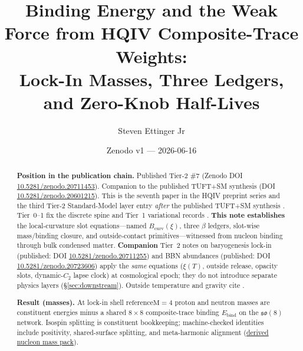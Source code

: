 \documentclass[11pt,notitlepage]{amsart}
\title[Binding energy and the weak force]{Binding Energy and the Weak Force from HQIV Composite-Trace Weights:\\
Lock-In Masses, Three Ledgers, and Zero-Knob Half-Lives}
\author{Steven Ettinger Jr}
\date{Zenodo v1 --- 2026-06-16}
\begin{document}
\begin{abstract}
\noindent\textbf{Position in the publication chain.}
Published Tier-2 \#7 (Zenodo
DOI \href{https://doi.org/10.5281/zenodo.20711453}{10.5281/zenodo.20711453}).
Companion to the published TUFT+SM synthesis \cite{hqiv-tuft-sm-lagrangian-paper}
(DOI \href{https://doi.org/10.5281/zenodo.20601215}{10.5281/zenodo.20601215}).
This is the seventh paper in the HQIV preprint series and the third Tier-2
Standard-Model layer entry \emph{after} the published TUFT+SM synthesis
\cite{hqiv-tuft-sm-lagrangian-paper}. Tier~0--1 fix the discrete spine
\cite{ettinger2026hqiv,hqiv-lightcone-paper,hqiv-so8-paper} and Tier~1 variational
records \cite{hqiv-3d-growth-paper,hqiv-oct-action-paper,hqiv-kirchhoff-paper,hqiv-thermo-arrow-paper}.
\textbf{This note establishes} the local-curvature slot equations---named
$B_{\mathrm{curv}}(\xi)$, three $\beta$ ledgers, slot-wise mass/binding closure, and
outside-contact primitives---witnessed from nucleon binding through bulk condensed matter.
\textbf{Companion} Tier~2 notes on baryogenesis lock-in
\cite{hqiv-baryogenesis-paper} (published:
DOI \href{https://doi.org/10.5281/zenodo.20711255}{10.5281/zenodo.20711255}) and BBN abundances
\cite{hqiv-bbn-paper} (published:
DOI \href{https://doi.org/10.5281/zenodo.20723606}{10.5281/zenodo.20723606}) apply the \emph{same} equations
($\xi(T)$, outside release, opacity slots, dynamic-$C_2$ lapse clock) at cosmological
epoch; they do not introduce separate physics layers (\S\ref{sec:downstream}).
Outside temperature and gravity cite
\cite{hqiv-thermo-arrow-paper,hqiv-flyby-paper}.

\noindent\textbf{Result (masses).}
At lock-in shell $\mathrm{referenceM}=4$ proton and neutron masses are constituent
energies minus a shared $8\times8$ composite-trace binding
$E_{\mathrm{bind}}$ on the $\mathfrak{so}(8)$ network. Isospin splitting is
constituent bookkeeping; machine-checked identities include positivity, shared-surface
splitting, and meta-harmonic alignment
(\hyperref[lean:derived-nucleon-pack]{derived nucleon mass pack}).


\end{abstract}
\end{document}

